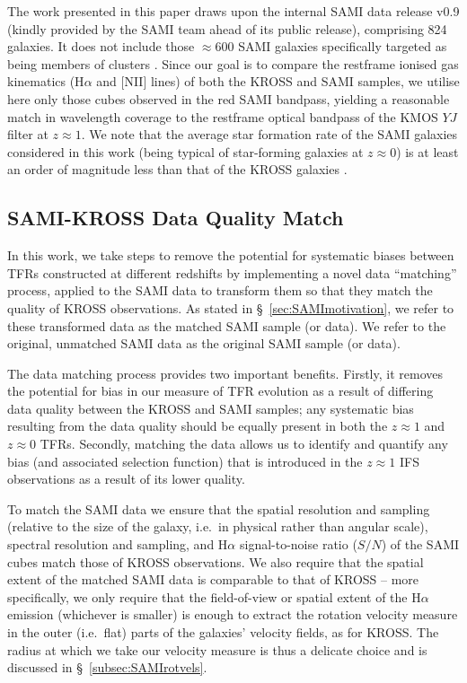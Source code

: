 \documentclass[a4paper,fleqn,usenatbib]{mnras}
\begin{document}
The work presented in this paper draws upon the internal SAMI data release v0.9 (kindly provided by the SAMI team ahead of its public release), comprising 824 galaxies. It does not include those $\approx600$ SAMI galaxies specifically targeted as being members of clusters \citep[see][]{Bryant:2015}. Since our goal is to compare the restframe ionised gas kinematics (H$\alpha$ and [N{\small II}] lines) of both the KROSS and SAMI samples, we utilise here only those cubes observed in the red SAMI bandpass, yielding a reasonable match in wavelength coverage to the restframe optical bandpass of the KMOS $YJ$ filter at $z\approx1$.  We note that the average star formation rate of the SAMI galaxies considered in this work (being typical of star-forming galaxies at $z\approx0$) is at least an order of magnitude less than that of the KROSS galaxies \citep{Johnson:2018}.  


\subsection{SAMI-KROSS Data Quality Match}
\label{subsec:SAMImatching}

In this work, we take steps to remove the potential for systematic biases between TFRs constructed at different redshifts by implementing a novel data ``matching'' process, applied to the SAMI data to transform them so that they match the quality of KROSS observations. As stated in \S~\ref{sec:SAMImotivation}, we refer to these transformed data as the matched SAMI sample (or data). We refer to the original, unmatched SAMI data as the original SAMI sample (or data). 

The data matching process provides two important benefits. Firstly, it removes the potential for bias in our measure of TFR evolution as a result of differing data quality between the KROSS and SAMI samples; any systematic bias resulting from the data quality should be equally present in both the $z\approx1$ and $z\approx0$ TFRs. Secondly, matching the data allows us to identify and quantify any bias (and associated selection function) that is introduced in the $z\approx1$ IFS observations as a result of its lower quality. 

To match the SAMI data we ensure that the spatial resolution and sampling (relative to the size of the galaxy, i.e.\ in physical rather than angular scale), spectral resolution and sampling, and H$\alpha$ signal-to-noise ratio ($S/N$) of the SAMI cubes match those of KROSS observations. We also require that the spatial extent of the matched SAMI data is comparable to that of KROSS -- more specifically, we only require that the field-of-view or spatial extent of the H$\alpha$ emission (whichever is smaller) is enough to extract the rotation velocity measure in the outer (i.e.\ flat) parts of the galaxies' velocity fields, as for KROSS. The radius at which we take our velocity measure is thus a delicate choice and is discussed in \S~\ref{subsec:SAMIrotvels}.
\end{document}
